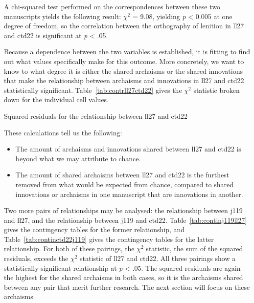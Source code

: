 A chi-squared test performed on the correspondences between these two manuscripts yields the following result: \(\chi^2\) = 9.08, yielding \emph{p} < 0.005 at one degree of freedom, so the correlation between the orthography of lenition in \gls{ll27} and \gls{ctd22} is  significant at \textit{p} < .05.

Because a dependence between the two variables is established, it is fitting to find out what values specifically make for this outcome. More concretely, we want to know to what degree it is either the shared archaisms or the shared innovations that make the relationship between archaisms and innovations in \gls{ll27} and \gls{ctd22} statistically significant. Table~\ref{tab:contrll27ctd22} gives the \(\chi^2\) statistic broken down for the individual cell values.

\begin{table}[h]
  \centering
  
  \caption{Squared residuals for the relationship between \gls{ll27} and \gls{ctd22}}
  \label{tab:contrll27ctd22}
\end{table}

These calculations tell us the following:
\begin{itemize}
\item The amount of archaisms and innovations shared between \gls{ll27} and \gls{ctd22} is beyond what we may attribute to chance.
\item The amount of shared archaisms between \gls{ll27} and \gls{ctd22} is the furthest removed from what would be expected from chance, compared to shared innovations or archaisms in one manuscript that are innovations in another.
\end{itemize}

Two more pairs of relationships may be analysed: the relationship between \gls{j119} and \gls{ll27}, and the relationship between \gls{j119} and \gls{ctd22}. Table~\ref{tab:continj119ll27} gives the contingency tables for the former relationship, and Table~\ref{tab:continctd22j119} gives the contingency tables for the latter relationship. For both of these pairings, the \(\chi^2\) statistic, \ie the sum of the squared residuals, exceeds the \(\chi^2\) statistic of \gls{ll27} and \gls{ctd22}. All three pairings show a statistically significant relationship at \textit{p} < .05. The squared residuals are again the highest for the shared archaisms in both cases, so it is the archaisms shared between any pair that merit further research. The next section will focus on these archaisms

